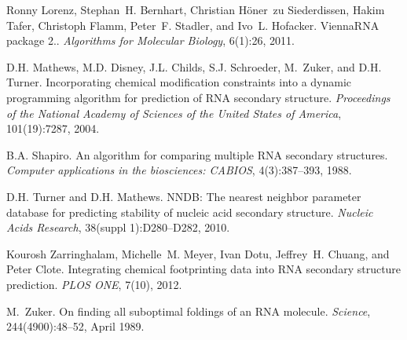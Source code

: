 \begin{DoxyDescription}
\item[\label{_CITEREF_lorenz:2011}%
\mbox{[}8\mbox{]}]Ronny Lorenz, Stephan~H. Bernhart, Christian H\"{o}ner~zu Siederdissen, Hakim Tafer, Christoph Flamm, Peter~F. Stadler, and Ivo~L. Hofacker. Vienna\+R\+N\+A package 2.. {\itshape Algorithms for Molecular Biology}, 6(1)\+:26, 2011. 


\item[\label{_CITEREF_mathews:2004}%
\mbox{[}9\mbox{]}]D.\+H. Mathews, M.\+D. Disney, J.\+L. Childs, S.\+J. Schroeder, M.~Zuker, and D.\+H. Turner. Incorporating chemical modification constraints into a dynamic programming algorithm for prediction of R\+N\+A secondary structure. {\itshape Proceedings of the National Academy of Sciences of the United States of America}, 101(19)\+:7287, 2004.


\item[\label{_CITEREF_shapiro:1988}%
\mbox{[}10\mbox{]}]B.\+A. Shapiro. An algorithm for comparing multiple R\+N\+A secondary structures. {\itshape Computer applications in the biosciences\+: C\+A\+B\+I\+O\+S}, 4(3)\+:387--393, 1988.


\item[\label{_CITEREF_turner:2010}%
\mbox{[}11\mbox{]}]D.\+H. Turner and D.\+H. Mathews. N\+N\+D\+B\+: The nearest neighbor parameter database for predicting stability of nucleic acid secondary structure. {\itshape Nucleic Acids Research}, 38(suppl 1)\+:D280--D282, 2010.


\item[\label{_CITEREF_zarringhalam:2012}%
\mbox{[}12\mbox{]}]Kourosh Zarringhalam, Michelle~M. Meyer, Ivan Dotu, Jeffrey~H. Chuang, and Peter Clote. Integrating chemical footprinting data into R\+N\+A secondary structure prediction. {\itshape P\+L\+O\+S O\+N\+E}, 7(10), 2012.


\item[\label{_CITEREF_zuker:1989}%
\mbox{[}13\mbox{]}]M.~Zuker. On finding all suboptimal foldings of an R\+N\+A molecule. {\itshape Science}, 244(4900)\+:48--52, April 1989.


\end{DoxyDescription}